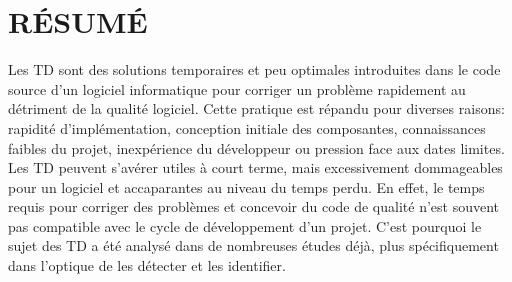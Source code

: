 %
%


\chapter*{RÉSUMÉ}\thispagestyle{headings}

\setlength{\parindent}{5ex} Les \ac{TD} sont des solutions temporaires et peu optimales introduites dans le code source d'un logiciel informatique pour corriger un probl\`{e}me rapidement au d\'{e}triment de la qualit\'{e} logiciel. Cette pratique est r\'{e}pandu pour diverses raisons: rapidit\'{e} d'impl\'{e}mentation, conception initiale des composantes, connaissances faibles du projet, inexp\'{e}rience du d\'{e}veloppeur ou pression face aux dates limites. Les \ac{TD} peuvent s'av\'{e}rer utiles \`{a} court terme, mais excessivement dommageables pour un logiciel et accaparantes au niveau du temps perdu. En effet, le temps requis pour corriger des probl\`{e}mes et concevoir du code de qualit\'{e} n'est souvent pas compatible avec le cycle de d\'{e}veloppement d'un projet. C'est pourquoi le sujet des \ac{TD} a \'{e}t\'{e} analys\'{e} dans de nombreuses \'{e}tudes d\'{e}j\`{a}, plus sp\'{e}cifiquement dans l'optique de les d\'{e}tecter et les identifier. \par

